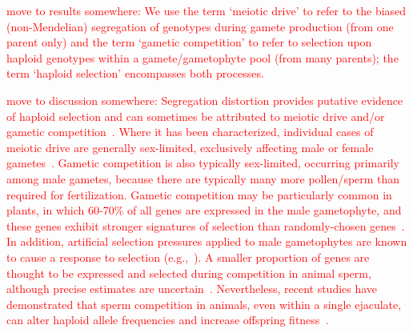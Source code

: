 \documentclass[10pt,letterpaper]{article}
\begin{document}
\textcolor{red}{move to results somewhere:
We use the term `meiotic drive' to refer to the biased (non-Mendelian) segregation of genotypes during gamete production (from one parent only) and the term `gametic competition' to refer to selection upon haploid genotypes within a gamete/gametophyte pool (from many parents); the term `haploid selection' encompasses both processes. }

\textcolor{red}{move to discussion somewhere:
Segregation distortion provides putative evidence of haploid selection and can sometimes be attributed to meiotic drive and/or gametic competition~\cite{Lalanne2004,Fishman2005,Leppala2008,Leppala2013,Didion2015,Didion2016}.
Where it has been characterized, individual cases of meiotic drive are generally sex-limited, exclusively affecting male or female gametes~\cite{Ubeda:2005gw,Lindholm:2016cw}.
Gametic competition is also typically sex-limited, occurring primarily among male gametes, because there are typically many more pollen/sperm than required for fertilization.
Gametic competition may be particularly common in plants, in which 60-70\% of all genes are expressed in the male gametophyte, and these genes exhibit stronger signatures of selection than randomly-chosen genes~\cite{Borg:2009jpa,Arunkumar:2013iq,Gossmann:2014dua}.
In addition, artificial selection pressures applied to male gametophytes are known to cause a response to selection (e.g.,~\cite{Hormaza:1996cv,Ravikumar:2003uo,Hedhly:2004iv,Clarke:2004ir}). 
A smaller proportion of genes are thought to be expressed and selected during competition in animal sperm, although precise estimates are uncertain~\cite{Zheng:2001fi,JOSEPH:2004haa,Vibranovski:2010et}. 
Nevertheless, recent studies have demonstrated that sperm competition in animals, even within a single ejaculate, can alter haploid allele frequencies and increase offspring fitness~\cite{Immler:2014im,Alavioon2017}.
}
\end{document}
